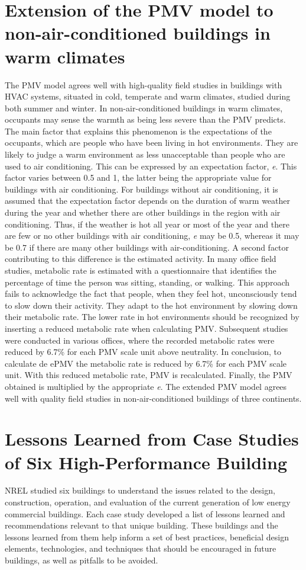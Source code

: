 \section{Extension of the PMV model to non-air-conditioned buildings in warm climates}
The PMV model agrees well with high-quality field studies in buildings with HVAC systems, situated in cold, temperate and warm climates, studied during both summer and winter. In non-air-conditioned buildings in warm climates, occupants may sense the warmth as being less severe than the PMV predicts. The main factor that explains this phenomenon is the expectations of the occupants, which are people who have been living in hot environments. They are likely to judge a warm environment as less unacceptable than people who are used to air conditioning. This can be expressed by an expectation factor, \textit{e}. This factor varies between 0.5 and 1, the latter being the appropriate value for buildings with air conditioning. For buildings without air conditioning, it is assumed that the expectation factor depends on the duration of warm weather during the year and whether there are other buildings in the region with air conditioning. Thus, if the weather is hot all year or most of the year and there are few or no other buildings with air conditioning, \textit{e} may be 0.5, whereas it may be 0.7 if there are many other buildings with air-conditioning. A second factor contributing to this difference is the estimated activity. In many office field studies, metabolic rate is estimated with a questionnaire that identifies the percentage of time the person was sitting, standing, or walking. This approach fails to acknowledge the fact that people, when they feel hot, unconsciously tend to slow down their activity. They adapt to the hot environment by slowing down their metabolic rate. The lower rate in hot environments should be recognized by inserting a reduced metabolic rate when calculating PMV. Subsequent studies were conducted in various offices, where the recorded metabolic rates were reduced by 6.7\% for each PMV scale unit above neutrality. In conclusion, to calculate de ePMV the metabolic rate is reduced by 6.7\% for each PMV scale unit. With this reduced metabolic rate, PMV is recalculated. Finally, the PMV obtained is multiplied by the appropriate \textit{e}. The extended PMV model agrees well with quality field studies in non-air-conditioned buildings of three continents.


\section{Lessons Learned from Case Studies of Six High-Performance Building}
NREL studied six buildings to understand the issues related to the design, construction, operation, and evaluation of the current generation of low energy commercial buildings. Each case study developed a list of lessons learned and recommendations relevant to that unique building. These buildings and the lessons learned from them help inform a set of best practices, beneficial design elements, technologies, and techniques that should be encouraged in future buildings, as well as pitfalls to be avoided. 

